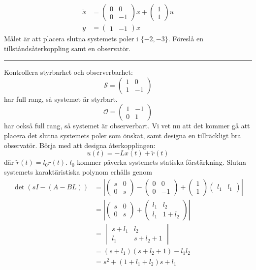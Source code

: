 \documentclass[12pt]{article}
\newcommand{\qline}{\hrule \vspace*{10pt}}
\begin{document}
\begin{align*}
  \dot{x} &= \begin{pmatrix}
             0 & 0 \\
             0 & -1
             \end{pmatrix}x + \begin{pmatrix}
               1 \\
               1
             \end{pmatrix}u \\
  y &= \begin{pmatrix}
    1 & -1
  \end{pmatrix}x
\end{align*}
Målet är att placera slutna systemets poler i $\lbrace -2, -3 \rbrace$. Föreslå en tillståndsåterkoppling samt en observatör.
\qline
Kontrollera styrbarhet och observerbarhet: 
\[\mathcal{S} = \begin{pmatrix}
1 & 0 \\
1 & -1
\end{pmatrix}\]
har full rang, så systemet är styrbart. 
\[\mathcal{O} = \begin{pmatrix}
1 & -1 \\
0 & 1
\end{pmatrix} \]
har också full rang, så systemet är observerbart. Vi vet nu att det kommer gå att placera det slutna systemets poler som önskat, samt designa en tillräckligt bra observatör. Börja med att designa återkopplingen: 
\[u(t) = -Lx(t) +\tilde{r}(t)\]
där $\tilde{r}(t) = l_0 r(t)$. $l_0$ kommer påverka systemets statiska förstärkning. Slutna systemets karaktäristiska polynom erhålls genom 
\begin{align*}
\det{(sI - (A-BL))} &= 
\left|
  \begin{pmatrix}
s & 0  \\
0 & s
  \end{pmatrix} - \begin{pmatrix}
0 & 0 \\
0 & -1
  \end{pmatrix} + \begin{pmatrix}
1 \\
1
  \end{pmatrix}\begin{pmatrix}
l_1 & l_1
  \end{pmatrix}
\right| \\
&= 
\left|
  \begin{pmatrix}
s & 0 \\
0 & s
  \end{pmatrix} + \begin{pmatrix}
l_1 & l_2 \\
l_1 & 1 + l_2
  \end{pmatrix}
\right| \\
 &= 
\begin{vmatrix}
s + l_1 & l_2 \\
l_1 & s+l_2+1
\end{vmatrix} \\
&= (s+l_1)(s+l_2+1)-l_1l_2 \\
&= s^2+(1+l_1+l_2)s+l_1
\end{align*}
\end{document}
